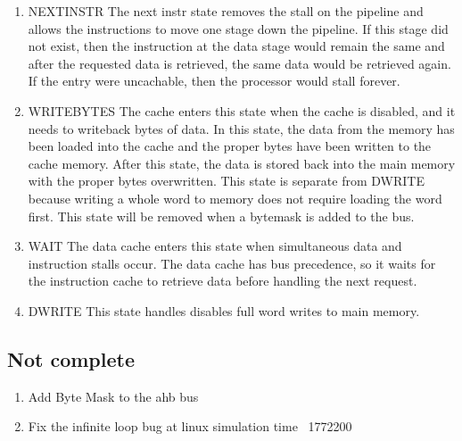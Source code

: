 \begin{enumerate}
	\item NEXTINSTR
	The next instr state removes the stall on the pipeline and allows the instructions to move one stage down the pipeline. If this stage did not exist, then the instruction at the data stage would remain the same and after the requested data is retrieved, the same data would be retrieved again. If the entry were uncachable, then the processor would stall forever.

	\item WRITEBYTES
	The cache enters this state when the cache is disabled, and it needs to writeback bytes of data. In this state, the data from the memory has been loaded into the cache and the proper bytes have been written to the cache memory. After this state, the data is stored back into the main memory with the proper bytes overwritten. This state is separate from DWRITE because writing a whole word to memory does not require loading the word first. This state will be removed when a bytemask is added to the bus.

	\item WAIT
	The data cache enters this state when simultaneous data and instruction stalls occur. The data cache has bus precedence, so it waits for the instruction cache to retrieve data before handling the next request. 

	\item DWRITE
	This state handles disables full word writes to main memory.
	
\end{enumerate}

\subsection{Not complete}

\begin{enumerate}
	\item Add Byte Mask to the ahb bus
	\item Fix the infinite loop bug at linux simulation time ~1772200
\end{enumerate}